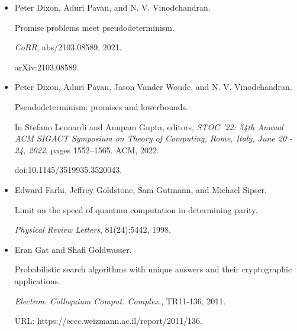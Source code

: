 \begin{itemize}
Andrew M. Childs and Jason M. Eisenberg.


Quantum algorithms for subset finding.


\emph{Quantum Inf. Comput.}, 5(7):593–604, 2005.


doi:10.26421/QIC5.7-7.





\item[] 
[10]

Peter Dixon, Aduri Pavan, and N. V. Vinodchandran.


Promise problems meet pseudodeterminism.


\emph{CoRR}, abs/2103.08589, 2021.


arXiv:2103.08589.





\item[] 
[11]

Peter Dixon, Aduri Pavan, Jason Vander Woude, and N. V. Vinodchandran.


Pseudodeterminism: promises and lowerbounds.


In Stefano Leonardi and Anupam Gupta, editors, \emph{STOC ’22: 54th
Annual ACM SIGACT Symposium on Theory of Computing, Rome, Italy, June 20
- 24, 2022}, pages 1552–1565. ACM, 2022.


doi:10.1145/3519935.3520043.





\item[] 
[12]

Edward Farhi, Jeffrey Goldstone, Sam Gutmann, and Michael Sipser.


Limit on the speed of quantum computation in determining parity.


\emph{Physical Review Letters}, 81(24):5442, 1998.





\item[] 
[13]

Eran Gat and Shafi Goldwasser.


Probabilistic search algorithms with unique answers and their
cryptographic applications.


\emph{Electron. Colloquium Comput. Complex.}, TR11-136, 2011.


URL: https://eccc.weizmann.ac.il/report/2011/136.






\end{itemize}
